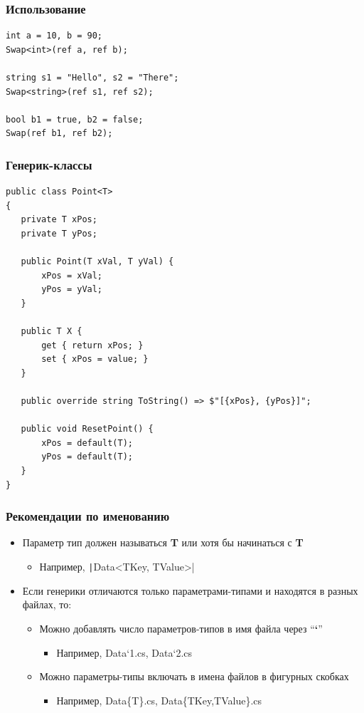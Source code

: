 \documentclass[xetex,mathserif,serif]{beamer}
\begin{document}
	\begin{frame}[fragile]
		\frametitle{Использование}
		\begin{verbatim}
int a = 10, b = 90;
Swap<int>(ref a, ref b);

string s1 = "Hello", s2 = "There";
Swap<string>(ref s1, ref s2);

bool b1 = true, b2 = false;
Swap(ref b1, ref b2);
		\end{verbatim}
	\end{frame}

	\begin{frame}[fragile]
		\frametitle{Генерик-классы}
		\begin{scriptsize}
			\begin{verbatim}
public class Point<T>
{
   private T xPos;
   private T yPos;

   public Point(T xVal, T yVal) {
       xPos = xVal;
       yPos = yVal;
   }
   
   public T X {
       get { return xPos; }
       set { xPos = value; }
   }

   public override string ToString() => $"[{xPos}, {yPos}]";

   public void ResetPoint() {
       xPos = default(T);
       yPos = default(T);
   }
}
			\end{verbatim}
		\end{scriptsize}
	\end{frame}

	\begin{frame}
		\frametitle{Рекомендации по именованию}
		\begin{itemize}
			\item Параметр тип должен называться \textbf{T} или хотя бы начинаться с \textbf{T}
			\begin{itemize}
				\item Например, \texttt|Data<TKey, TValue>|
			\end{itemize}
			\item Если генерики отличаются только параметрами-типами и находятся в разных файлах, то:
			\begin{itemize}
				\item Можно добавлять число параметров-типов в имя файла через ``\textbf{`}''
				\begin{itemize}
					\item Например, Data`1.cs, Data`2.cs
				\end{itemize}
				\item Можно параметры-типы включать в имена файлов в фигурных скобках
				\begin{itemize}
					\item Например, Data\{T\}.cs, Data\{TKey,TValue\}.cs
				\end{itemize}
			\end{itemize}
		\end{itemize}
	\end{frame}
\end{document}

